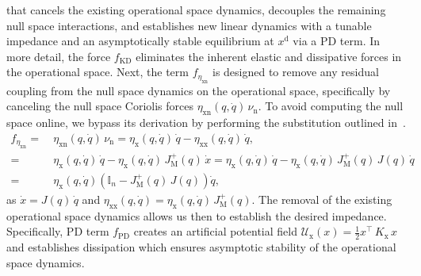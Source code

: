 that cancels the existing operational space dynamics, decouples the remaining null space interactions, and establishes new linear dynamics with a tunable impedance and an asymptotically stable equilibrium at $x^\mathrm{d}$ via a PD term. In more detail, the force $f_\mathrm{KD}$ eliminates the inherent elastic and dissipative forces in the operational space. Next, the term $f_{\eta_\mathrm{xn}}$ is designed to remove any residual coupling from the null space dynamics on the operational space, specifically by canceling the null space Coriolis forces $\eta_\mathrm{xn}(q,\dot{q}) \, \nu_\mathrm{n}$. To avoid computing the null space online, we bypass its derivation by performing the substitution outlined in~\citep{ott2008cartesian, della2020model}.
\begin{equation}
\begin{split}
    f_{\eta_\mathrm{xn}} =& \: \eta_\mathrm{xn}(q,\dot{q}) \, \nu_\mathrm{n} = \eta_\mathrm{x}(q,\dot{q}) \, \dot{q} - \eta_\mathrm{xx}(q,\dot{q}) \, \dot{q},\\
    =& \: \eta_\mathrm{x}(q,\dot{q}) \, \dot{q} - \eta_\mathrm{x}(q,\dot{q}) \, J_\mathrm{M}^+(q) \, \dot{x} = \eta_\mathrm{x}(q,\dot{q}) \, \dot{q} - \eta_\mathrm{x}(q,\dot{q}) \, J_\mathrm{M}^+(q) \, J(q) \, \dot{q}\\
    =& \: \eta_\mathrm{x}(q,\dot{q}) \left ( \mathbb{I}_n - J_\mathrm{M}^{+}(q) \, J(q)  \right ) \dot{q},
\end{split}
\end{equation}
as $\dot{x} = J(q) \, \dot{q}$ and $\eta_\mathrm{xx}(q,\dot{q}) = \eta_\mathrm{x}(q,\dot{q}) \, J_\mathrm{M}^+(q)$.
The removal of the existing operational space dynamics allows us then to establish the desired impedance. Specifically, PD term $f_\mathrm{PD}$ creates an artificial potential field $\mathcal{U}_\mathrm{x}(x) = \frac{1}{2}x^\top \, K_\mathrm{x} \, x$ and establishes dissipation which ensures asymptotic stability of the operational space dynamics.
